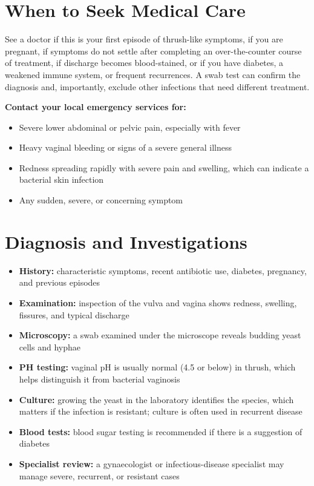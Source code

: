 \section*{When to Seek Medical Care}
See a doctor if this is your first episode of thrush-like symptoms, if you are pregnant, if symptoms do not settle after completing an over-the-counter course of treatment, if discharge becomes blood-stained, or if you have diabetes, a weakened immune system, or frequent recurrences. A swab test can confirm the diagnosis and, importantly, exclude other infections that need different treatment.

\textbf{Contact your local emergency services for:}
\begin{itemize}
    \item Severe lower abdominal or pelvic pain, especially with fever
    \item Heavy vaginal bleeding or signs of a severe general illness
    \item Redness spreading rapidly with severe pain and swelling, which can indicate a bacterial skin infection
    \item Any sudden, severe, or concerning symptom
\end{itemize}

\section*{Diagnosis and Investigations}
\begin{itemize}
    \item \textbf{History:} characteristic symptoms, recent antibiotic use, diabetes, pregnancy, and previous episodes
    \item \textbf{Examination:} inspection of the vulva and vagina shows redness, swelling, fissures, and typical discharge
    \item \textbf{Microscopy:} a swab examined under the microscope reveals budding yeast cells and hyphae
    \item \textbf{PH testing:} vaginal pH is usually normal (4.5 or below) in thrush, which helps distinguish it from bacterial vaginosis
    \item \textbf{Culture:} growing the yeast in the laboratory identifies the species, which matters if the infection is resistant; culture is often used in recurrent disease
    \item \textbf{Blood tests:} blood sugar testing is recommended if there is a suggestion of diabetes
    \item \textbf{Specialist review:} a gynaecologist or infectious-disease specialist may manage severe, recurrent, or resistant cases
\end{itemize}

